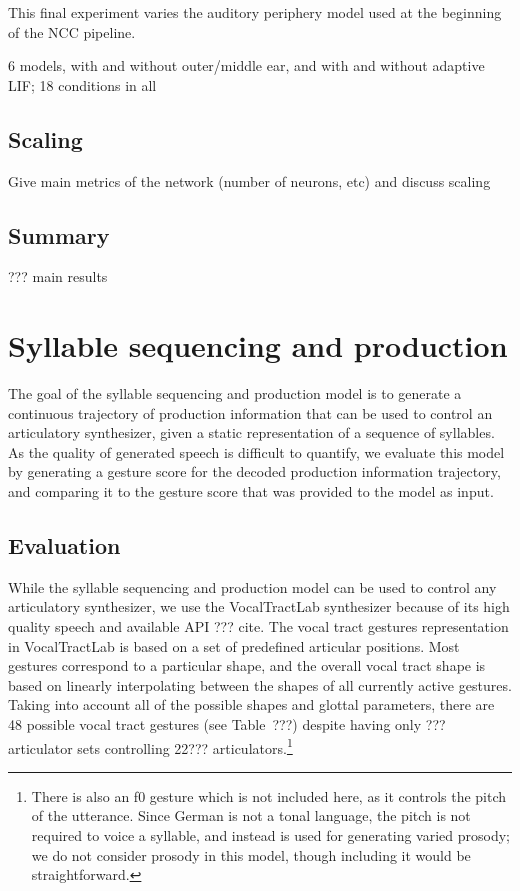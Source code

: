 This final experiment varies the auditory periphery model
used at the beginning of the NCC pipeline.

6 models, with and without outer/middle ear, and with and without adaptive LIF;
18 conditions in all

\subsection{Scaling}

Give main metrics of the network (number of neurons, etc)
and discuss scaling

\subsection{Summary}

??? main results

\section{Syllable sequencing and production}

The goal of the syllable sequencing and production model
is to generate a continuous trajectory
of production information
that can be used to control
an articulatory synthesizer,
given a static representation
of a sequence of syllables.
As the quality of generated speech
is difficult to quantify,
we evaluate this model
by generating a gesture score
for the decoded production information trajectory,
and comparing it
to the gesture score that was provided
to the model as input.

\subsection{Evaluation}

While the syllable sequencing and production model
can be used to control any articulatory synthesizer,
we use the VocalTractLab synthesizer
because of its high quality speech
and available API ??? cite.
The vocal tract gestures representation
in VocalTractLab is based on a set of
predefined articular positions.
Most gestures correspond to
a particular shape,
and the overall vocal tract shape
is based on linearly interpolating
between the shapes of
all currently active gestures.
Taking into account all of the
possible shapes and glottal parameters,
there are 48 possible vocal tract gestures
(see Table~???) despite having only
??? articulator sets
controlling 22??? articulators.\footnote{
  There is also an f0 gesture which is not included here,
  as it controls the pitch of the utterance.
  Since German is not a tonal language,
  the pitch is not required to voice a syllable,
  and instead is used for generating
  varied prosody;
  we do not consider prosody in this model,
  though including it would be straightforward.}

